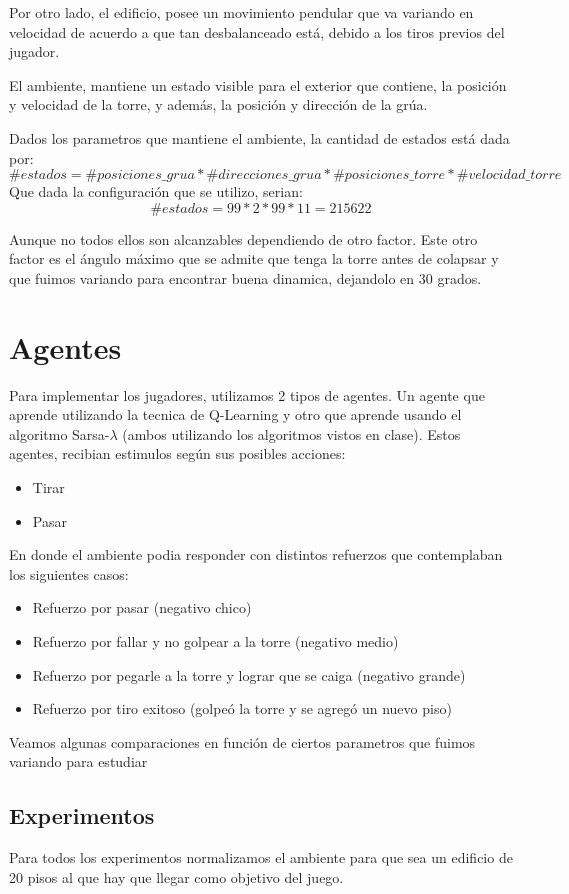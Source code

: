 \documentclass[11pt, a4paper]{article}
\begin{document}
Por otro lado, el edificio, posee un movimiento pendular que va variando en velocidad de acuerdo a que tan desbalanceado est\'a, debido a los tiros previos del jugador. 

El ambiente, mantiene un estado visible para el exterior que contiene, la posici\'on y velocidad de la torre, y adem\'as, la posici\'on y direcci\'on de la gr\'ua. 

Dados los parametros que mantiene el ambiente, la cantidad de estados est\'a dada por:
$$ \#estados = \#posiciones\_grua * \#direcciones\_grua * \#posiciones\_torre *  \#velocidad\_torre  $$
Que dada la configuraci\'on que se utilizo, serian:
$$ \# estados = 99 * 2 *99 * 11 = 215622 $$

Aunque no todos ellos son alcanzables dependiendo de otro factor. Este otro factor es el \'angulo m\'aximo que se admite que tenga la torre antes de colapsar y que fuimos variando para encontrar buena dinamica, dejandolo en 30 grados. 

\section{Agentes}
Para implementar los jugadores, utilizamos 2 tipos de agentes. Un agente que aprende utilizando la tecnica de Q-Learning y otro que aprende usando el algoritmo Sarsa-$\lambda$ (ambos utilizando los algoritmos vistos en clase).
Estos agentes, recibian estimulos seg\'un sus posibles acciones: 
\begin{itemize}
\item Tirar
\item Pasar
\end{itemize}
En donde el ambiente podia responder con distintos refuerzos que contemplaban los siguientes casos:
\begin{itemize}
\item Refuerzo por pasar (negativo chico)
\item Refuerzo por fallar y no golpear a la torre (negativo medio)
\item Refuerzo por pegarle a la torre y lograr que se caiga (negativo grande)
\item Refuerzo por tiro  exitoso (golpe\'o la torre y se agreg\'o un nuevo piso)
\end{itemize}


Veamos algunas comparaciones en funci\'on de ciertos parametros que fuimos variando para estudiar 
\subsection{Experimentos}
Para todos los experimentos normalizamos el ambiente para que sea un edificio de 20 pisos al que hay que llegar como objetivo del juego. 
\end{document}
